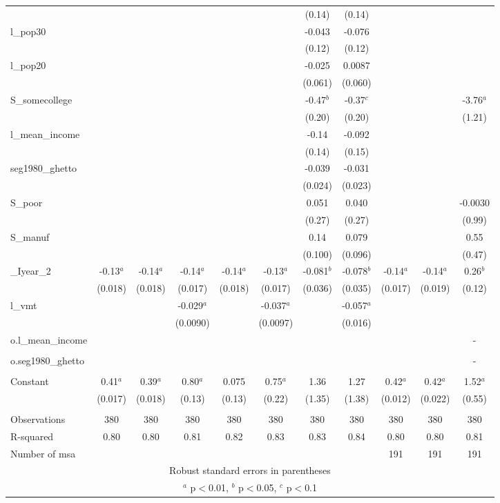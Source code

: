 \documentclass[]{article}
\begin{document}
\begin{tabular}{lcccccccccc}
 &  &  &  &  &  & (0.14) & (0.14) &  &  &  \\
l\_pop30 &  &  &  &  &  & -0.043 & -0.076 &  &  &  \\
 &  &  &  &  &  & (0.12) & (0.12) &  &  &  \\
l\_pop20 &  &  &  &  &  & -0.025 & 0.0087 &  &  &  \\
 &  &  &  &  &  & (0.061) & (0.060) &  &  &  \\
S\_somecollege &  &  &  &  &  & -0.47$^b$ & -0.37$^c$ &  &  & -3.76$^a$ \\
 &  &  &  &  &  & (0.20) & (0.20) &  &  & (1.21) \\
l\_mean\_income &  &  &  &  &  & -0.14 & -0.092 &  &  &  \\
 &  &  &  &  &  & (0.14) & (0.15) &  &  &  \\
seg1980\_ghetto &  &  &  &  &  & -0.039 & -0.031 &  &  &  \\
 &  &  &  &  &  & (0.024) & (0.023) &  &  &  \\
S\_poor &  &  &  &  &  & 0.051 & 0.040 &  &  & -0.0030 \\
 &  &  &  &  &  & (0.27) & (0.27) &  &  & (0.99) \\
S\_manuf &  &  &  &  &  & 0.14 & 0.079 &  &  & 0.55 \\
 &  &  &  &  &  & (0.100) & (0.096) &  &  & (0.47) \\
\_Iyear\_2 & -0.13$^a$ & -0.14$^a$ & -0.14$^a$ & -0.14$^a$ & -0.13$^a$ & -0.081$^b$ & -0.078$^b$ & -0.14$^a$ & -0.14$^a$ & 0.26$^b$ \\
 & (0.018) & (0.018) & (0.017) & (0.018) & (0.017) & (0.036) & (0.035) & (0.017) & (0.019) & (0.12) \\
l\_vmt &  &  & -0.029$^a$ &  & -0.037$^a$ &  & -0.057$^a$ &  &  &  \\
 &  &  & (0.0090) &  & (0.0097) &  & (0.016) &  &  &  \\
o.l\_mean\_income &  &  &  &  &  &  &  &  &  & - \\
 &  &  &  &  &  &  &  &  &  &  \\
o.seg1980\_ghetto &  &  &  &  &  &  &  &  &  & - \\
 &  &  &  &  &  &  &  &  &  &  \\
Constant & 0.41$^a$ & 0.39$^a$ & 0.80$^a$ & 0.075 & 0.75$^a$ & 1.36 & 1.27 & 0.42$^a$ & 0.42$^a$ & 1.52$^a$ \\
 & (0.017) & (0.018) & (0.13) & (0.13) & (0.22) & (1.35) & (1.38) & (0.012) & (0.022) & (0.55) \\
 &  &  &  &  &  &  &  &  &  &  \\
Observations & 380 & 380 & 380 & 380 & 380 & 380 & 380 & 380 & 380 & 380 \\
R-squared & 0.80 & 0.80 & 0.81 & 0.82 & 0.83 & 0.83 & 0.84 & 0.80 & 0.80 & 0.81 \\
 Number of msa &  &  &  &  &  &  &  & 191 & 191 & 191 \\ \hline
\multicolumn{11}{c}{ Robust standard errors in parentheses} \\
\multicolumn{11}{c}{ $^a$ p$<$0.01, $^b$ p$<$0.05, $^c$ p$<$0.1} \\
\end{tabular}
\end{document}
